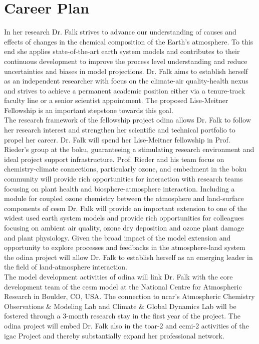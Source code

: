 \section{Career Plan}
\label{sec:career}
In her research Dr. Falk strives to advance our understanding of causes and effects of changes in the chemical composition of the Earth’s atmosphere. To this end she applies state-of-the-art earth system models and contributes to their continuous development to improve the process level understanding and reduce uncertainties and biases in model projections. Dr. Falk aims to establish herself as an independent researcher with focus on the climate-air quality-health nexus and strives to achieve a permanent academic position either via a tenure-track faculty line or a senior scientist appointment. The proposed Lise-Meitner Fellowship is an important stepstone towards this goal.\\
The research framework of the fellowship project \gls{odina} allows Dr. Falk to follow her research interest and strengthen her scientific and technical portfolio to propel her career. Dr. Falk will spend her Lise-Meitner fellowship in Prof. Rieder’s group at the \gls{boku}, guaranteeing a stimulating research environment and ideal project support infrastructure. Prof. Rieder and his team focus on chemistry-climate connections, particularly ozone, and embedment in the \gls{boku} community will provide rich opportunities for interaction with research teams focusing on plant health and biosphere-atmosphere interaction. Including a module for coupled ozone chemistry between the atmosphere and land-surface components of \gls{cesm} Dr. Falk will provide an important extension to one of the widest used earth system models and provide rich opportunities for colleagues focusing on ambient air quality, ozone dry deposition and ozone plant damage and plant physiology. Given the broad impact of the model extension and opportunity to explore processes and feedbacks in the atmosphere-land system the \gls{odina} project will allow Dr. Falk to establish herself as an emerging leader in the field of land-atmosphere interaction.\\
The model development activities of \gls{odina} will link Dr. Falk with the core development team of the \gls{cesm} model at the National Centre for Atmospheric Research in Boulder, CO, USA. The connection to \gls{ncar}'s Atmospheric Chemistry Observations \& Modeling Lab and Climate \& Global Dynamics Lab will be fostered through a 3-month research stay in the first year of the project. The \gls{odina} project will embed Dr. Falk also in the \gls{toar}-2 and \gls{ccmi}-2 activities of the \gls{igac} Project and thereby substantially expand her professional network.\\
